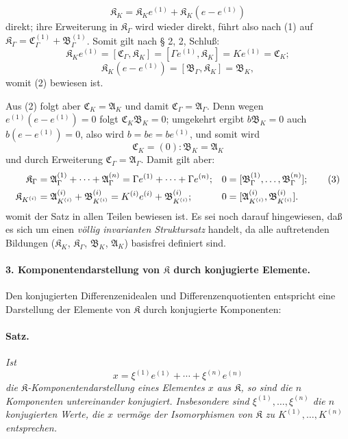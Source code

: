 \[
\mathfrak K_K=\mathfrak K_K e^{(1)}+\mathfrak K_K(e-e^{(1)})
\]
direkt; ihre Erweiterung in $\mathfrak K_\Gamma$ wird wieder direkt, führt also nach (1) auf $\mathfrak K_\Gamma=\mathfrak C_\Gamma^{(1)}+\mathfrak B_\Gamma^{(1)}$. Somit gilt nach § 2, 2, Schluß:
\[
\mathfrak K_K e^{(1)}=[\mathfrak C_\Gamma,\mathfrak K_K]
=[\Gamma e^{(1)},\mathfrak K_K]=Ke^{(1)}=\mathfrak C_K;
\]
\[
\mathfrak K_K(e-e^{(1)})=[\mathfrak B_\Gamma,\mathfrak K_K]=\mathfrak B_K,
\]
womit (2) bewiesen ist.

Aus (2) folgt aber $\mathfrak C_K=\mathfrak A_K$ und damit $\mathfrak C_\Gamma=\mathfrak A_\Gamma$. Denn wegen $e^{(1)}(e-e^{(1)})=0$ folgt $\mathfrak C_K\mathfrak B_K=0$; umgekehrt ergibt $b\mathfrak B_K=0$ auch $b(e-e^{(1)})=0$, also wird $b=be=be^{(1)}$, und somit wird
\[
\mathfrak C_K=(0):\mathfrak B_K=\mathfrak A_K
\]
und durch Erweiterung $\mathfrak C_\Gamma=\mathfrak A_\Gamma$. Damit gilt aber:
\begin{align}
\mathfrak K_\Gamma
&=\mathfrak A_\Gamma^{(1)}+\cdots+\mathfrak A_\Gamma^{(n)}
=\Gamma e^{(1)}+\cdots+\Gamma e^{(n)};
&0&=[\mathfrak B_\Gamma^{(1)},\ldots,\mathfrak B_\Gamma^{(n)}]; \tag{3}\\
\mathfrak K_{K^{(i)}}
&=\mathfrak A_{K^{(i)}}^{(i)}+\mathfrak B_{K^{(i)}}^{(i)}
=K^{(i)}e^{(i)}+\mathfrak B_{K^{(i)}}^{(i)};
&0&=[\mathfrak A_{K^{(i)}}^{(i)},\mathfrak B_{K^{(i)}}^{(i)}].\notag
\end{align}
womit der Satz in allen Teilen bewiesen ist. Es sei noch darauf hingewiesen, daß es sich um einen \emph{völlig invarianten Struktursatz} handelt, da alle auftretenden Bildungen ($\mathfrak K_K$, $\mathfrak K_\Gamma$, $\mathfrak B_K$, $\mathfrak A_K$) basisfrei definiert sind.

\paragraph{3. Komponentendarstellung von $\mathfrak K$ durch konjugierte Elemente.}
Den konjugierten Differenzenidealen und Differenzenquotienten entspricht eine Darstellung der Elemente von $\mathfrak K$ durch konjugierte Komponenten:

\paragraph{Satz.}
\emph{Ist
\[
x=\xi^{(1)}e^{(1)}+\cdots+\xi^{(n)}e^{(n)}
\]
die $\mathfrak K$-Komponentendarstellung eines Elementes $x$ aus $\mathfrak K$, so sind die $n$ Komponenten untereinander konjugiert. Insbesondere sind $\xi^{(1)},\ldots,\xi^{(n)}$ die $n$ konjugierten Werte, die $x$ vermöge der Isomorphismen von $\mathfrak K$ zu $K^{(1)},\ldots,K^{(n)}$ entsprechen.}

